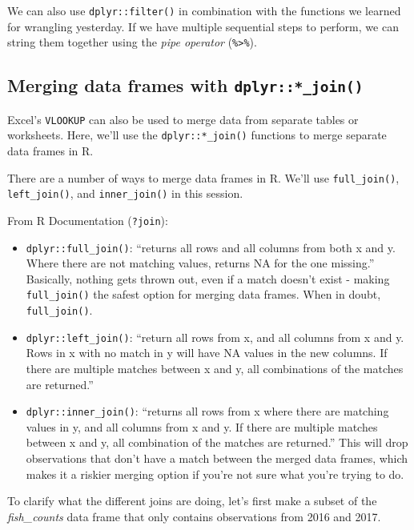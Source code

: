 \documentclass[]{book}
\providecommand{\tightlist}{%
  \setlength{\itemsep}{0pt}\setlength{\parskip}{0pt}}
\begin{document}
We can also use \texttt{dplyr::filter()} in combination with the functions we learned for wrangling yesterday. If we have multiple sequential steps to perform, we can string them together using the \emph{pipe operator} (\texttt{\%\textgreater{}\%}).

\hypertarget{merging-data-frames-with-dplyr_join}{%
\subsection{\texorpdfstring{Merging data frames with \texttt{dplyr::*\_join()}}{Merging data frames with dplyr::*\_join()}}\label{merging-data-frames-with-dplyr_join}}

Excel's \texttt{VLOOKUP} can also be used to merge data from separate tables or worksheets. Here, we'll use the \texttt{dplyr::*\_join()} functions to merge separate data frames in R.

There are a number of ways to merge data frames in R. We'll use \texttt{full\_join()}, \texttt{left\_join()}, and \texttt{inner\_join()} in this session.

From R Documentation (\texttt{?join}):

\begin{itemize}
\tightlist
\item
  \texttt{dplyr::full\_join()}: ``returns all rows and all columns from both x and y. Where there are not matching values, returns NA for the one missing.'' Basically, nothing gets thrown out, even if a match doesn't exist - making \texttt{full\_join()} the safest option for merging data frames. When in doubt, \texttt{full\_join()}.
\item
  \texttt{dplyr::left\_join()}: ``return all rows from x, and all columns from x and y. Rows in x with no match in y will have NA values in the new columns. If there are multiple matches between x and y, all combinations of the matches are returned.''
\item
  \texttt{dplyr::inner\_join()}: ``returns all rows from x where there are matching values in y, and all columns from x and y. If there are multiple matches between x and y, all combination of the matches are returned.'' This will drop observations that don't have a match between the merged data frames, which makes it a riskier merging option if you're not sure what you're trying to do.
\end{itemize}

To clarify what the different joins are doing, let's first make a subset of the \emph{fish\_counts} data frame that only contains observations from 2016 and 2017.
\end{document}
